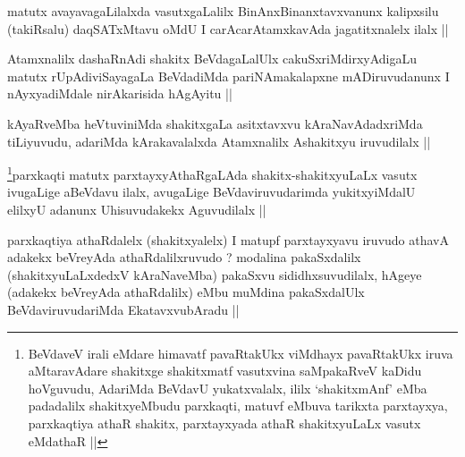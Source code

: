\begin{artha}
matutx avayavagaLilalxda vasutxgaLalilx BinAnxBinanxtavxvanunx
kalipxsilu (takiRsalu) daqSATxMtavu oMdU I carAcarAtamxkavAda
jagatitxnalelx ilalx ||
\end{artha}

\begin{artha}
Atamxnalilx dashaRnAdi shakitx BeVdagaLalUlx cakuSxriMdirxyAdigaLu
matutx rUpAdiviSayagaLa BeVdadiMda pariNAmakalapxne mADiruvudanunx I
nAyxyadiMdale nirAkarisida hAgAyitu ||
\end{artha}


\begin{artha}
kAyaRveMba heVtuviniMda shakitxgaLa asitxtavxvu kAraNavAdadxriMda
tiLiyuvudu, adariMda kArakavalalxda Atamxnalilx Ashakitxyu iruvudilalx ||
\end{artha}


\begin{artha}
\footnote[1]{BeVdaveV irali eMdare himavatf pavaRtakUkx viMdhayx
  pavaRtakUkx iruva aMtaravAdare shakitxge shakitxmatf vasutxvina
  saMpakaRveV kaDidu hoVguvudu, AdariMda BeVdavU yukatxvalalx, ililx
  `shakitxmAnf' eMba padadalilx shakitxyeMbudu parxkaqti, matuvf
  eMbuva tarikxta parxtayxya, parxkaqtiya athaR shakitx, parxtayxyada
  athaR shakitxyuLaLx vasutx eMdathaR ||}parxkaqti matutx parxtayxyAthaRgaLAda
shakitx-shakitxyuLaLx vasutx ivugaLige aBeVdavu ilalx, avugaLige
BeVdaviruvudarimda yukitxyiMdalU elilxyU adanunx Uhisuvudakekx
Aguvudilalx ||
\end{artha}


\begin{artha}
parxkaqtiya athaRdalelx (shakitxyalelx) I matupf parxtayxyavu iruvudo
athavA adakekx beVreyAda athaRdalilxruvudo ? modalina pakaSxdalilx
(shakitxyuLaLxdedxV kAraNaveMba) pakaSxvu sididhxsuvudilalx, hAgeye
(adakekx beVreyAda athaRdalilx) eMbu muMdina pakaSxdalUlx
BeVdaviruvudariMda EkatavxvubAradu ||
\end{artha}


